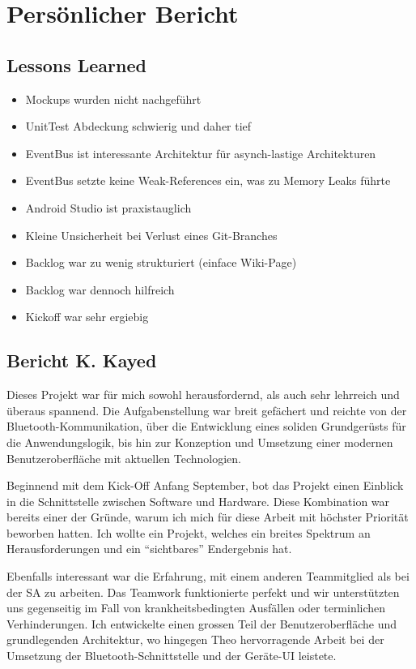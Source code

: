 \section{Persönlicher Bericht}
\label{Persönlicher Bericht}

\subsection{Lessons Learned}
\label{sub:lessons_learned}

\begin{itemize}
\item{Mockups wurden nicht nachgeführt}
\item{UnitTest Abdeckung schwierig und daher tief}
\item{EventBus ist interessante Architektur für asynch-lastige Architekturen}
\item{EventBus setzte keine Weak-References ein, was zu Memory Leaks führte}
\item{Android Studio ist praxistauglich}
\item{Kleine Unsicherheit bei Verlust eines Git-Branches}
\item{Backlog war zu wenig strukturiert (einface Wiki-Page)}
\item{Backlog war dennoch hilfreich}
\item{Kickoff war sehr ergiebig}
\end{itemize}

\subsection{Bericht K. Kayed}

Dieses Projekt war für mich sowohl herausfordernd, als auch sehr lehrreich und überaus spannend. Die Aufgabenstellung war breit gefächert und reichte von der Bluetooth-Kommunikation, über die Entwicklung eines soliden Grundgerüsts für die Anwendungslogik, bis hin zur Konzeption und Umsetzung einer modernen Benutzeroberfläche mit aktuellen Technologien.

Beginnend mit dem Kick-Off Anfang September, bot das Projekt einen Einblick in die Schnittstelle zwischen Software und Hardware. Diese Kombination war bereits einer der Gründe, warum ich mich für diese Arbeit mit höchster Priorität beworben hatten. Ich wollte ein Projekt, welches ein breites Spektrum an Herausforderungen und ein \enquote{sichtbares} Endergebnis hat.

Ebenfalls interessant war die Erfahrung, mit einem anderen Teammitglied als bei der SA zu arbeiten. Das Teamwork funktionierte perfekt und wir unterstützten uns gegenseitig im Fall von krankheitsbedingten Ausfällen oder terminlichen Verhinderungen. Ich entwickelte einen grossen Teil der Benutzeroberfläche und grundlegenden Architektur, wo hingegen Theo hervorragende Arbeit bei der Umsetzung der Bluetooth-Schnittstelle und der Geräte-UI leistete.

